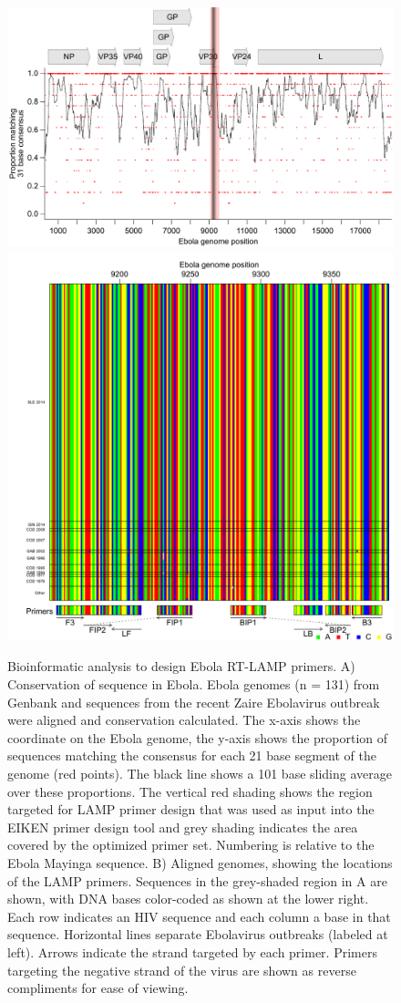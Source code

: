 \documentclass[../sherrill-Mix_thesis.tex]{subfiles}
\begin{document}
	\begin{figure}
		\centering
		\includegraphics[width=.6\textwidth]{ebolaConsensus.pdf} %
		\includegraphics[width=.6\textwidth]{loop_bases.pdf} %
		\caption[Ebola RT-LAMP primers design]{Bioinformatic analysis to design Ebola RT-LAMP primers. A) Conservation of sequence in Ebola. Ebola genomes (n = 131) from Genbank and sequences from the recent Zaire Ebolavirus outbreak \citep{Gire2014} were aligned and conservation calculated. The x-axis shows the coordinate on the Ebola genome, the y-axis shows the proportion of sequences matching the consensus for each 21 base segment of the genome (red points). The black line shows a 101 base sliding average over these proportions. The vertical red shading shows the region targeted for LAMP primer design that was used as input into the EIKEN primer design tool and grey shading indicates the area covered by the optimized primer set. Numbering is relative to the Ebola Mayinga sequence. B) Aligned genomes, showing the locations of the LAMP primers. Sequences in the grey-shaded region in A are shown, with DNA bases color-coded as shown at the lower right. Each row indicates an HIV sequence and each column a base in that sequence. Horizontal lines separate Ebolavirus outbreaks (labeled at left). Arrows indicate the strand targeted by each primer. Primers targeting the negative strand of the virus are shown as reverse compliments for ease of viewing.}
		\label{figEbolaConsensus}
	\end{figure}
\end{document}
